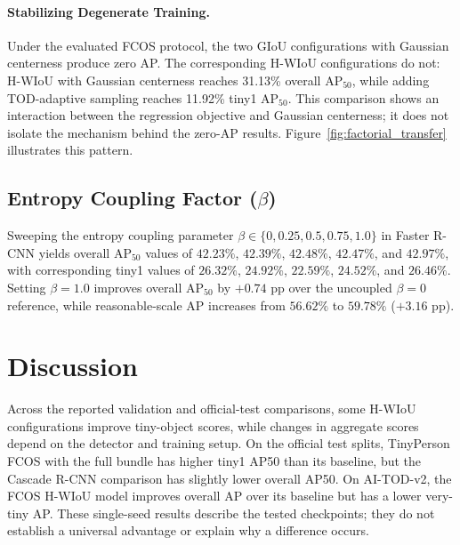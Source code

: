 \documentclass[11pt,a4paper]{article}
\begin{document}
\paragraph{Stabilizing Degenerate Training.}
Under the evaluated FCOS protocol, the two GIoU configurations with Gaussian centerness produce zero AP. The corresponding H-WIoU configurations do not: H-WIoU with Gaussian centerness reaches 31.13\% overall $\mathrm{AP}_{50}$, while adding TOD-adaptive sampling reaches 11.92\% tiny1 $\mathrm{AP}_{50}$. This comparison shows an interaction between the regression objective and Gaussian centerness; it does not isolate the mechanism behind the zero-AP results. Figure~\ref{fig:factorial_transfer} illustrates this pattern.

\subsection{Entropy Coupling Factor ($\beta$)}
\label{sec:beta_sweep}
Sweeping the entropy coupling parameter $\beta \in \{0, 0.25, 0.5, 0.75, 1.0\}$ in Faster R-CNN yields overall $\mathrm{AP}_{50}$ values of $42.23\%$, $42.39\%$, $42.48\%$, $42.47\%$, and $42.97\%$, with corresponding tiny1 values of $26.32\%$, $24.92\%$, $22.59\%$, $24.52\%$, and $26.46\%$. Setting $\beta = 1.0$ improves overall $\mathrm{AP}_{50}$ by $+0.74$ pp over the uncoupled $\beta = 0$ reference, while reasonable-scale AP increases from $56.62\%$ to $59.78\%$ ($+3.16$ pp).


\section{Discussion}
Across the reported validation and official-test comparisons, some H-WIoU configurations improve tiny-object scores, while changes in aggregate scores depend on the detector and training setup. On the official test splits, TinyPerson FCOS with the full bundle has higher tiny1 AP50 than its baseline, but the Cascade R-CNN comparison has slightly lower overall AP50. On AI-TOD-v2, the FCOS H-WIoU model improves overall AP over its baseline but has a lower very-tiny AP. These single-seed results describe the tested checkpoints; they do not establish a universal advantage or explain why a difference occurs.
\end{document}
